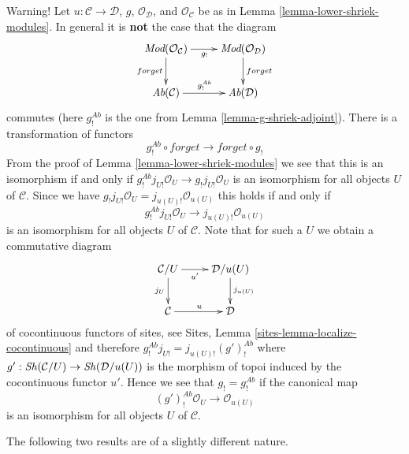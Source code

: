 \begin{remark}
\label{remark-when-shriek-equal}
Warning! Let $u : \mathcal{C} \to \mathcal{D}$, $g$, $\mathcal{O}_\mathcal{D}$,
and $\mathcal{O}_\mathcal{C}$ be as in Lemma \ref{lemma-lower-shriek-modules}.
In general it is {\bf not} the case that the diagram
$$
\xymatrix{
\textit{Mod}(\mathcal{O}_\mathcal{C}) \ar[r]_{g_!} \ar[d]_{forget} &
\textit{Mod}(\mathcal{O}_\mathcal{D}) \ar[d]^{forget} \\
\textit{Ab}(\mathcal{C}) \ar[r]^{g^{Ab}_!} &
\textit{Ab}(\mathcal{D})
}
$$
commutes (here $g^{Ab}_!$ is the one from
Lemma \ref{lemma-g-shriek-adjoint}). There is a transformation
of functors
$$
g_!^{Ab} \circ forget \longrightarrow forget \circ g_!
$$
From the proof of Lemma \ref{lemma-lower-shriek-modules}
we see that this is an isomorphism if and only if
$g^{Ab}_!j_{U!}\mathcal{O}_U \to g_!j_{U!}\mathcal{O}_U$
is an isomorphism for all objects $U$ of $\mathcal{C}$.
Since we have $g_!j_{U!}\mathcal{O}_U = j_{u(U)!}\mathcal{O}_{u(U)}$
this holds if and only if
$$
g^{Ab}_!j_{U!}\mathcal{O}_U \longrightarrow j_{u(U)!}\mathcal{O}_{u(U)}
$$
is an isomorphism for all objects $U$ of $\mathcal{C}$. Note that for such a
$U$ we obtain a commutative diagram
$$
\xymatrix{
\mathcal{C}/U \ar[r]_-{u'} \ar[d]_{j_U} & \mathcal{D}/u(U) \ar[d]^{j_{u(U)}} \\
\mathcal{C} \ar[r]^u & \mathcal{D}
}
$$
of cocontinuous functors of sites, see
Sites, Lemma \ref{sites-lemma-localize-cocontinuous}
and therefore $g^{Ab}_!j_{U!} = j_{u(U)!}(g')^{Ab}_!$ where
$g' : \mathop{\mathit{Sh}}\nolimits(\mathcal{C}/U) \to \mathop{\mathit{Sh}}\nolimits(\mathcal{D}/u(U))$ is the morphism
of topoi induced by the cocontinuous functor $u'$.
Hence we see that $g_! = g^{Ab}_!$ if the canonical map
\begin{equation}
\label{equation-compare-on-localizations}
(g')^{Ab}_!\mathcal{O}_U \longrightarrow \mathcal{O}_{u(U)}
\end{equation}
is an isomorphism for all objects $U$ of $\mathcal{C}$.
\end{remark}

\noindent
The following two results are of a slightly different nature.

